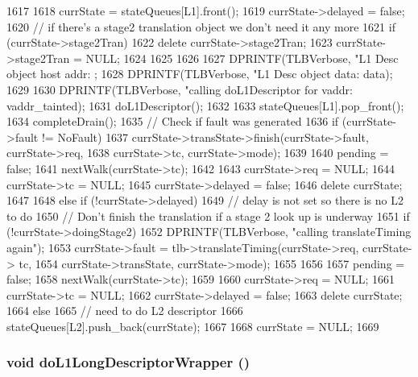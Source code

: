 \begin{DoxyCode}
1617 {
1618     currState = stateQueues[L1].front();
1619     currState->delayed = false;
1620     // if there's a stage2 translation object we don't need it any more
1621     if (currState->stage2Tran) {
1622         delete currState->stage2Tran;
1623         currState->stage2Tran = NULL;
1624     }
1625 
1626 
1627     DPRINTF(TLBVerbose, "L1 Desc object host addr: %
      ;
1628     DPRINTF(TLBVerbose, "L1 Desc object      data: %
      data);
1629 
1630     DPRINTF(TLBVerbose, "calling doL1Descriptor for vaddr:%
      vaddr_tainted);
1631     doL1Descriptor();
1632 
1633     stateQueues[L1].pop_front();
1634     completeDrain();
1635     // Check if fault was generated
1636     if (currState->fault != NoFault) {
1637         currState->transState->finish(currState->fault, currState->req,
1638                                       currState->tc, currState->mode);
1639 
1640         pending = false;
1641         nextWalk(currState->tc);
1642 
1643         currState->req = NULL;
1644         currState->tc = NULL;
1645         currState->delayed = false;
1646         delete currState;
1647     }
1648     else if (!currState->delayed) {
1649         // delay is not set so there is no L2 to do
1650         // Don't finish the translation if a stage 2 look up is underway
1651         if (!currState->doingStage2) {
1652             DPRINTF(TLBVerbose, "calling translateTiming again\n");
1653             currState->fault = tlb->translateTiming(currState->req, currState->
      tc,
1654                 currState->transState, currState->mode);
1655         }
1656 
1657         pending = false;
1658         nextWalk(currState->tc);
1659 
1660         currState->req = NULL;
1661         currState->tc = NULL;
1662         currState->delayed = false;
1663         delete currState;
1664     } else {
1665         // need to do L2 descriptor
1666         stateQueues[L2].push_back(currState);
1667     }
1668     currState = NULL;
1669 }
\end{DoxyCode}
\hypertarget{classArmISA_1_1TableWalker_adbdea710854a60040764157e313f730c}{
\subsubsection[{doL1LongDescriptorWrapper}]{\setlength{\rightskip}{0pt plus 5cm}void doL1LongDescriptorWrapper ()}}
\label{classArmISA_1_1TableWalker_adbdea710854a60040764157e313f730c}



